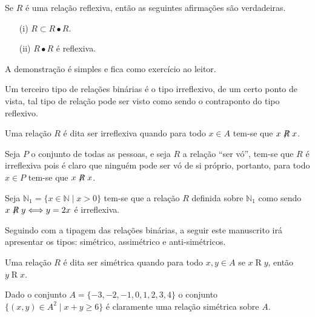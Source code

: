 \begin{teorema}
	Se $R$ é uma relação reflexiva, então as seguintes afirmações são verdadeiras.
	\begin{itemize}
		\item[(i)] $R \subset R \bullet R$.
		\item[(ii)] $R \bullet R$ é reflexiva.
	\end{itemize}
\end{teorema}

\begin{prova}
	A demonstração é simples e fica como exercício ao leitor.
\end{prova}

Um terceiro tipo de relações binárias é o tipo irreflexivo, de um certo ponto de vista, tal tipo de relação pode ser visto como sendo o contraponto do tipo reflexivo.


\begin{definicao}\label{def:RelacaoIrreflexiva}
	Uma relação $R$ é dita ser irreflexiva quando para todo $x \in A$ tem-se que $x \centernot{R} x$.
\end{definicao}

\begin{exemplo}
	Seja $P$ o conjunto de todas as pessoas, e seja $R$ a relação ``ser vó'', tem-se que $R$ é irreflexiva pois é claro que ninguém pode ser vó de si próprio, portanto, para todo $x \in P$ tem-se que $x \centernot{R} x$.
\end{exemplo}

\begin{exemplo}
	Seja $\mathbb{N}_1 = \{x \in \mathbb{N} \mid x > 0\}$ tem-se que a relação $R$ definida sobre $\mathbb{N}_1$ como sendo $x \centernot{R} y \Longleftrightarrow y = 2x$ é irreflexiva.
\end{exemplo}

Seguindo com a tipagem das relações binárias,  a seguir este manuscrito irá apresentar os tipos: simétrico, assimétrico e anti-simétricos.

\begin{definicao}\label{def:RelacaoSimétrica}
	Uma relação $R$ é dita ser simétrica quando para todo $x, y \in A$ se $x \mathrel{R} y$, então $y \mathrel{R} x$.
\end{definicao}

\begin{exemplo}
	Dado o conjunto $A = \{-3, -2, -1, 0, 1, 2, 3, 4\}$ o conjunto $\{(x, y) \in A^2 \mid x + y \geq 6\}$ é claramente uma relação simétrica sobre $A$.
\end{exemplo}

